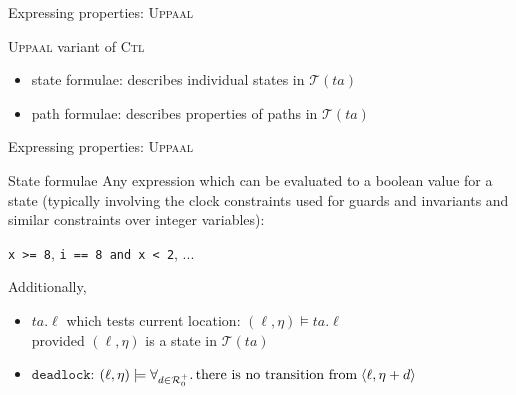 \documentclass{beamer}
\def\dgold#1{{\darkgoldenrod #1}}
\def\dkb#1{{\blue #1}}
\def\R{\mathcal{R}}
\def\TL#1{\mathcal{T}(#1)}
\begin{document}
\begin{slide}{Expressing properties: \textsc{Uppaal}}
\small

\begin{block}{\textsc{Uppaal} variant of \textsc{Ctl}}
\begin{itemize}
\item \dkb{state formulae}:  describes individual states in $\TL{ta}$
\item \dkb{path formulae}: describes properties of paths in $\TL{ta}$
\end{itemize}
\end{block}

\end{slide}

\begin{slide}{Expressing properties: \textsc{Uppaal}}
\small

\begin{block}{State formulae}
Any expression which can be evaluated to a boolean value for a state (typically involving the 
\dgold{clock constraints} used for guards and invariants and similar constraints over integer variables):
\begin{center}
\texttt{x >= 8}, \texttt{i == 8 and x < 2}, ...
\end{center}
Additionally,
\begin{itemize}
\item \dkb{$ta.\ell$} which tests \dgold{current location}:  $(\ell, \eta) \models ta.\ell$ \\
provided $(\ell, \eta)$ is a state in $\TL{ta}$
\item \dkb{$\texttt{deadlock}$}: $(\ell, \eta) \models \forall_{d \in \R_0^+} .\, \text{there is no transition from} \; \pair{\ell,\eta+d}$ 
\end{itemize}
\end{block}

\end{slide}
\end{document}
